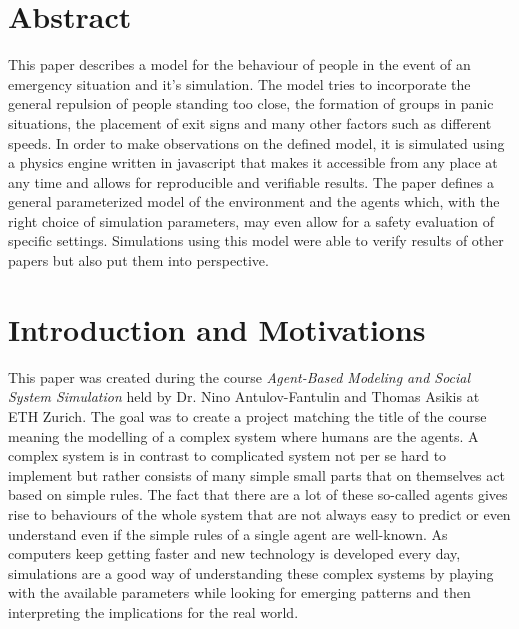 \documentclass[11pt]{article}
\begin{document}






\tableofcontents

\newpage




\section{Abstract}

This paper describes a model for the behaviour of people in the event of an emergency situation and it's simulation. The model tries to incorporate the general repulsion of people standing too close, the formation of groups in panic situations, the placement of exit signs and many other factors such as different speeds. In order to make observations on the defined model, it is simulated using a physics engine written in javascript that makes it accessible from any place at any time and allows for reproducible and verifiable results. The paper defines a general parameterized model of the environment and the agents which, with the right choice of simulation parameters, may even allow for a safety evaluation of specific settings. Simulations using this model were able to verify results of other papers but also put them into perspective.

\section{Introduction and Motivations}

This paper was created during the course \textit{Agent-Based Modeling and Social System Simulation} held by Dr. Nino Antulov-Fantulin and Thomas Asikis at ETH Zurich. The goal was to create a project matching the title of the course meaning the modelling of a complex system where humans are the agents. A complex system is in contrast to complicated system not per se hard to implement but rather consists of many simple small parts that on themselves act based on simple rules. The fact that there are a lot of these so-called agents gives rise to behaviours of the whole system that are not always easy to predict or even understand even if the simple rules of a single agent are well-known. As computers keep getting faster and new technology is developed every day, simulations are a good way of understanding these complex systems by playing with the available parameters while looking for emerging patterns and then interpreting the implications for the real world.
\end{document}
